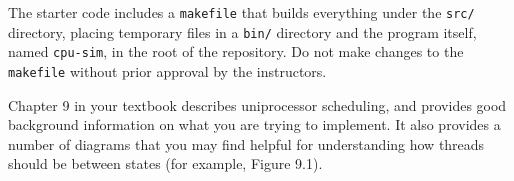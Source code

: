\documentclass[main.tex]{subfiles}
\begin{document}
The starter code includes a \texttt{makefile} that builds everything under the \texttt{src/} directory, placing temporary files in a \texttt{bin/} directory and the program itself, named \texttt{cpu-sim}, in the root of the repository. Do not make changes to the \texttt{makefile} without prior approval by the instructors.


Chapter 9 in your textbook describes uniprocessor scheduling, and provides good background information on what you are trying to implement. It also provides a number of diagrams that you may find helpful for understanding how threads should be between states (for example, Figure 9.1).
\end{document}
